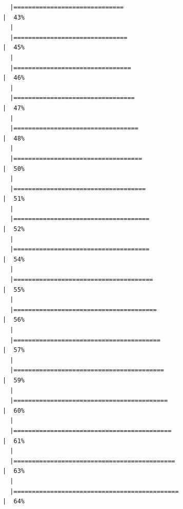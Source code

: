 \documentclass[
  letterpaper,
  DIV=11,
  numbers=noendperiod]{scrartcl}
\begin{document}
\begin{verbatim}
  |==============================                                        |  43%
  |                                                                            
  |===============================                                       |  45%
  |                                                                            
  |================================                                      |  46%
  |                                                                            
  |=================================                                     |  47%
  |                                                                            
  |==================================                                    |  48%
  |                                                                            
  |===================================                                   |  50%
  |                                                                            
  |====================================                                  |  51%
  |                                                                            
  |=====================================                                 |  52%
  |                                                                            
  |=====================================                                 |  54%
  |                                                                            
  |======================================                                |  55%
  |                                                                            
  |=======================================                               |  56%
  |                                                                            
  |========================================                              |  57%
  |                                                                            
  |=========================================                             |  59%
  |                                                                            
  |==========================================                            |  60%
  |                                                                            
  |===========================================                           |  61%
  |                                                                            
  |============================================                          |  63%
  |                                                                            
  |=============================================                         |  64%

\end{verbatim}
\end{document}
